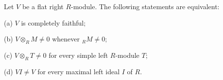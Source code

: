 Let $V$ be a flat right $R$-module. The following statements are equivalent:

(a) $V$ is completely faithful;

(b) $V \otimes_R M \neq 0$ whenever ${}_R M \neq 0$;

(c) $V \otimes_R T \neq 0$ for every simple left $R$-module $T$;

(d) $VI \neq V$ for every maximal left ideal $I$ of $R$.
